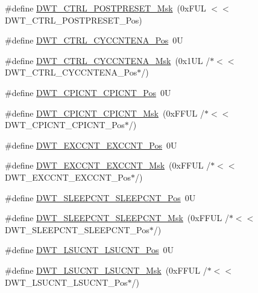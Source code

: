 \begin{DoxyCompactItemize}
\item 
\#define \hyperlink{group___c_m_s_i_s___d_w_t_ga11d9e1e2a758fdd2657aa68ce61b9c9d}{D\+W\+T\+\_\+\+C\+T\+R\+L\+\_\+\+P\+O\+S\+T\+P\+R\+E\+S\+E\+T\+\_\+\+Msk}~(0x\+F\+U\+L $<$$<$ D\+W\+T\+\_\+\+C\+T\+R\+L\+\_\+\+P\+O\+S\+T\+P\+R\+E\+S\+E\+T\+\_\+\+Pos)
\item 
\#define \hyperlink{group___c_m_s_i_s___d_w_t_gaa4509f5f8514a7200be61691f0e01f10}{D\+W\+T\+\_\+\+C\+T\+R\+L\+\_\+\+C\+Y\+C\+C\+N\+T\+E\+N\+A\+\_\+\+Pos}~0U
\item 
\#define \hyperlink{group___c_m_s_i_s___d_w_t_ga4a9d209dc2a81ea6bfa0ea21331769d3}{D\+W\+T\+\_\+\+C\+T\+R\+L\+\_\+\+C\+Y\+C\+C\+N\+T\+E\+N\+A\+\_\+\+Msk}~(0x1\+U\+L /$\ast$$<$$<$ D\+W\+T\+\_\+\+C\+T\+R\+L\+\_\+\+C\+Y\+C\+C\+N\+T\+E\+N\+A\+\_\+\+Pos$\ast$/)
\item 
\#define \hyperlink{group___c_m_s_i_s___d_w_t_ga80e9ad8f6a9e2344af8a3cf989bebe3d}{D\+W\+T\+\_\+\+C\+P\+I\+C\+N\+T\+\_\+\+C\+P\+I\+C\+N\+T\+\_\+\+Pos}~0U
\item 
\#define \hyperlink{group___c_m_s_i_s___d_w_t_ga76f39e7bca3fa86a4dbf7b8f6adb7217}{D\+W\+T\+\_\+\+C\+P\+I\+C\+N\+T\+\_\+\+C\+P\+I\+C\+N\+T\+\_\+\+Msk}~(0x\+F\+F\+U\+L /$\ast$$<$$<$ D\+W\+T\+\_\+\+C\+P\+I\+C\+N\+T\+\_\+\+C\+P\+I\+C\+N\+T\+\_\+\+Pos$\ast$/)
\item 
\#define \hyperlink{group___c_m_s_i_s___d_w_t_ga031c693654030d4cba398b45d2925b1d}{D\+W\+T\+\_\+\+E\+X\+C\+C\+N\+T\+\_\+\+E\+X\+C\+C\+N\+T\+\_\+\+Pos}~0U
\item 
\#define \hyperlink{group___c_m_s_i_s___d_w_t_ga057fa604a107b58a198bbbadb47e69c9}{D\+W\+T\+\_\+\+E\+X\+C\+C\+N\+T\+\_\+\+E\+X\+C\+C\+N\+T\+\_\+\+Msk}~(0x\+F\+F\+U\+L /$\ast$$<$$<$ D\+W\+T\+\_\+\+E\+X\+C\+C\+N\+T\+\_\+\+E\+X\+C\+C\+N\+T\+\_\+\+Pos$\ast$/)
\item 
\#define \hyperlink{group___c_m_s_i_s___d_w_t_ga0371a84a7996dc5852c56afb2676ba1c}{D\+W\+T\+\_\+\+S\+L\+E\+E\+P\+C\+N\+T\+\_\+\+S\+L\+E\+E\+P\+C\+N\+T\+\_\+\+Pos}~0U
\item 
\#define \hyperlink{group___c_m_s_i_s___d_w_t_ga1e340751d71413fef400a0a1d76cc828}{D\+W\+T\+\_\+\+S\+L\+E\+E\+P\+C\+N\+T\+\_\+\+S\+L\+E\+E\+P\+C\+N\+T\+\_\+\+Msk}~(0x\+F\+F\+U\+L /$\ast$$<$$<$ D\+W\+T\+\_\+\+S\+L\+E\+E\+P\+C\+N\+T\+\_\+\+S\+L\+E\+E\+P\+C\+N\+T\+\_\+\+Pos$\ast$/)
\item 
\#define \hyperlink{group___c_m_s_i_s___d_w_t_gab9394c7911b0b4312a096dad91d53a3d}{D\+W\+T\+\_\+\+L\+S\+U\+C\+N\+T\+\_\+\+L\+S\+U\+C\+N\+T\+\_\+\+Pos}~0U
\item 
\#define \hyperlink{group___c_m_s_i_s___d_w_t_ga2186d7fc9317e20bad61336ee2925615}{D\+W\+T\+\_\+\+L\+S\+U\+C\+N\+T\+\_\+\+L\+S\+U\+C\+N\+T\+\_\+\+Msk}~(0x\+F\+F\+U\+L /$\ast$$<$$<$ D\+W\+T\+\_\+\+L\+S\+U\+C\+N\+T\+\_\+\+L\+S\+U\+C\+N\+T\+\_\+\+Pos$\ast$/)
$$
\end{DoxyCompactItemize}
